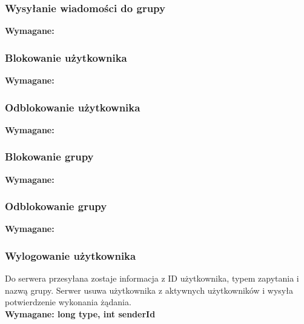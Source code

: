 \documentclass[11pt]{article}
\begin{document}
	\subsubsection{Wysyłanie wiadomości do grupy}
	\textbf{Wymagane:}
	\subsubsection{Blokowanie użytkownika}
	\textbf{Wymagane:}
	\subsubsection{Odblokowanie użytkownika}
	\textbf{Wymagane:}
	\subsubsection{Blokowanie grupy}
	\textbf{Wymagane:}
	\subsubsection{Odblokowanie grupy}
	\textbf{Wymagane:}
	\subsubsection{Wylogowanie użytkownika}
	Do serwera przesyłana zostaje informacja z ID użytkownika, typem zapytania i nazwą grupy. Serwer usuwa użytkownika z aktywnych użytkowników i wysyła potwierdzenie wykonania żądania.\\
	\textbf{Wymagane: long type, int senderId}
	
\end{document}

